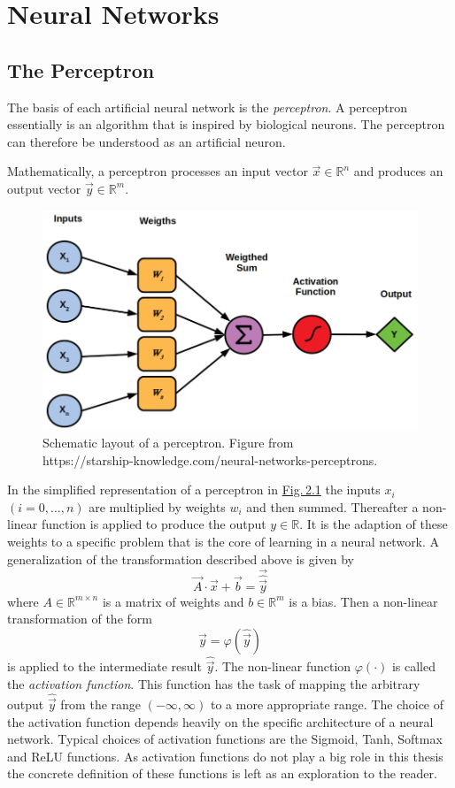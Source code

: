 \section{Neural Networks}
\subsection{The Perceptron}
The basis of each artificial neural network is the \textit{perceptron}. A perceptron essentially is an algorithm that is inspired by biological neurons. The perceptron can therefore be understood as an artificial neuron.

Mathematically, a perceptron processes an input vector $\vec{x}\in\mathbb{R}^n$ and produces an output vector $\vec{y}\in\mathbb{R}^m$. 
%
\begin{figure} \label{fig:2.1}
    \centering
    \includegraphics[width=.5\textwidth]{Chapters/figures/perceptron.PNG}
    \caption[Schematic layout of a perceptron]{Schematic layout of a perceptron. Figure from\\ https://starship-knowledge.com/neural-networks-perceptrons.}
\end{figure}
%
In the simplified representation of a perceptron in \hyperref[fig:2.1]{Fig.\,2.1} the inputs $x_i$ $ (i=0,\dots,n)$ are multiplied by weights $w_i$ and then summed. Thereafter a non-linear function is applied to produce the output $y\in\mathbb{R}$. It is the adaption of these weights to a specific problem that is the core of learning in a neural network. A generalization of the transformation described above is given by
%
\begin{equation} \label{equ:2.1}
    \vec{A}\cdot\vec{x}+\vec{b}=\vec{\hat{\vec{y}}}
\end{equation}
%
where $A\in\mathbb{R}^{m\times n}$ is a matrix of weights and $b\in\mathbb{R}^m$ is a bias. Then a non-linear transformation of the form
%
\begin{equation} \label{equ:2.2}
    \vec{y}=\varphi(\hat{\vec{y}})
\end{equation}
%
is applied to the intermediate result $\hat{\vec{y}}$. The non-linear function $\varphi(\cdot)$ is called the \textit{activation function}. This function has the task of mapping the arbitrary output $\hat{\vec{y}}$ from the range $(-\infty,\infty)$ to a more appropriate range. The choice of the activation function depends heavily on the specific architecture of a neural network. Typical choices of activation functions are the Sigmoid, Tanh, Softmax and ReLU functions. As activation functions do not play a big role in this thesis the concrete definition of these functions is left as an exploration to the reader.
%
